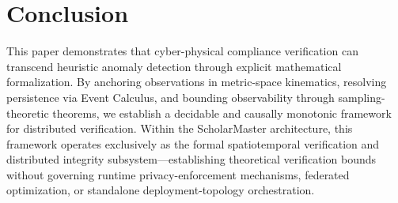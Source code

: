 \documentclass[conference]{IEEEtran}
\begin{document}
\section{Conclusion}
This paper demonstrates that cyber-physical compliance verification can transcend heuristic anomaly detection through explicit mathematical formalization. By anchoring observations in metric-space kinematics, resolving persistence via Event Calculus, and bounding observability through sampling-theoretic theorems, we establish a decidable and causally monotonic framework for distributed verification. Within the ScholarMaster architecture, this framework operates exclusively as the formal spatiotemporal verification and distributed integrity subsystem---establishing theoretical verification bounds without governing runtime privacy-enforcement mechanisms, federated optimization, or standalone deployment-topology orchestration.
\end{document}
